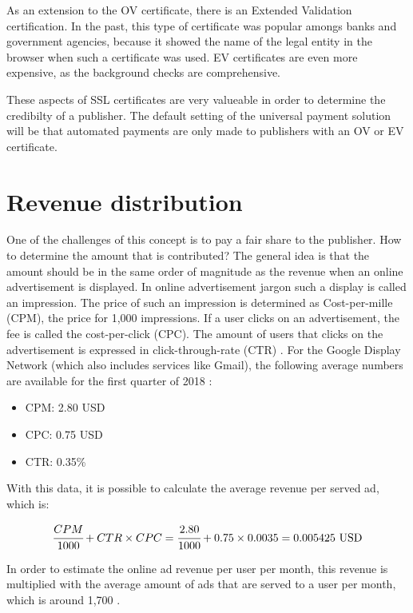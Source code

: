As an extension to the OV certificate, there is an Extended Validation certification. In the past, this type of certificate was popular amongs banks and government agencies, because it showed the name of the legal entity in the browser when such a certificate was used. EV certificates are even more expensive, as the background checks are comprehensive.

These aspects of SSL certificates are very valueable in order to determine the credibilty of a publisher. The default setting of the universal payment solution will be that automated payments are only made to publishers with an OV or EV certificate.

\section{Revenue distribution}

One of the challenges of this concept is to pay a fair share to the publisher. How to determine the amount that is contributed? The general idea is that the amount should be in the same order of magnitude as the revenue when an online advertisement is displayed. In online advertisement jargon such a display is called an impression. The price of such an impression is determined as Cost-per-mille (CPM), the price for 1,000 impressions. If a user clicks on an advertisement, the fee is called the cost-per-click (CPC). The amount of users that clicks on the advertisement is expressed in click-through-rate (CTR) \cite{evans2009online}. For the Google Display Network (which also includes services like Gmail), the following average numbers are available for the first quarter of 2018 \cite{cpmgoogle}: 

\begin{itemize}
  \item CPM: 2.80 USD
  \item CPC: 0.75 USD
  \item CTR: 0.35\%
\end{itemize}

\noindent With this data, it is possible to calculate the average revenue per served ad, which is:

\begin{equation}
\cfrac{CPM}{1000} + CTR \times CPC = \cfrac{2.80}{1000} + 0.75 \times 0.0035 = 0.005425 ~\text{USD}
\end{equation}

\noindent In order to estimate the online ad revenue per user per month, this revenue is multiplied with the average amount of ads that are served to a user per month, which is around 1,700 \cite{papadopoulos2018cost}. 

